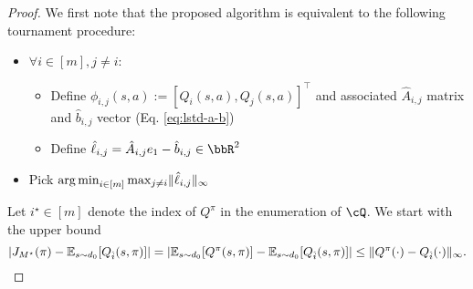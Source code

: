 \begin{proof}
We first note that the proposed algorithm is equivalent to the following tournament procedure:
\begin{itemize}
    \item $\forall i \in [m],j \neq i:$
    \begin{itemize}
        \item Define $\phi_{i,j}(s,a):= [Q_i(s,a), Q_j(s,a)]^\top$ and associated $\hat{A}_{i,j}$ matrix and $\hat{b}_{i,j}$ vector (Eq. \ref{eq:lstd-a-b})
        \item Define $\hat{\ell}_{i,j} =  \hat{A}_{i,j} e_1 - \hat{b}_{i,j} \in \bbR^2$
    \end{itemize}
    \item Pick $\operatorname*{arg\,min}_{i \in [m]} \max_{j \neq i} \lVert\hat{\ell}_{i,j}\rVert_\infty$
\end{itemize}

Let $i^\star \in [m]$ denote the index of $Q^{\pi}$ in the enumeration of $\cQ$. We start with the upper bound 
\[
\lvert J_{M^\star}(\pi) - \mathbb{E}_{s \sim d_0}[Q_{\hat{i}}(s,\pi)]\rvert = \lvert\mathbb{E}_{s \sim d_0}[Q^{\pi}(s,\pi)] - \mathbb{E}_{s \sim d_0}[Q_{\hat{i}}(s,\pi)]\rvert\leq \lVert Q^{\pi}(\cdot)  - Q_{\hat{i}}(\cdot)\rVert_\infty.
\]


\end{proof}
